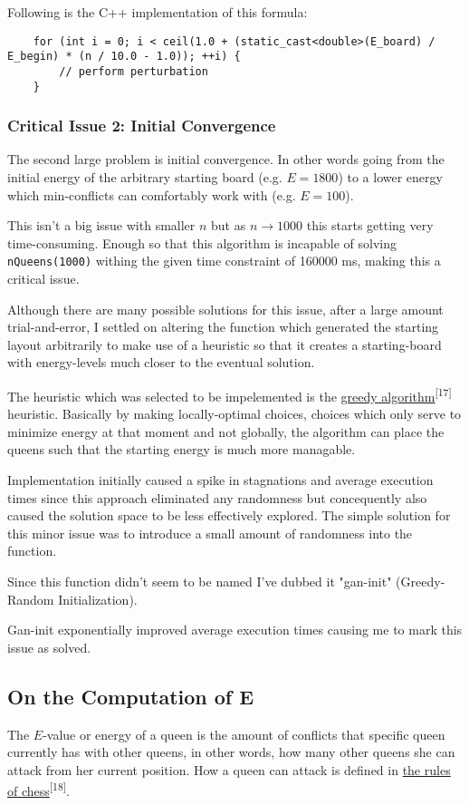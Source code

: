\documentclass{article}
\begin{document}
Following is the C++ implementation of this formula:

\begin{lstlisting}
    for (int i = 0; i < ceil(1.0 + (static_cast<double>(E_board) / E_begin) * (n / 10.0 - 1.0)); ++i) {
        // perform perturbation
    }
\end{lstlisting}

\subsubsection{Critical Issue 2: Initial Convergence}
The second large problem is initial convergence. In other words going from the initial energy of the arbitrary starting board (e.g. $E=1800$)
to a lower energy which min-conflicts can comfortably work with (e.g. $E=100$).

This isn't a big issue with smaller $n$ but as $n \to 1000$ this starts getting very time-consuming.
Enough so that this algorithm is incapable of solving \texttt{nQueens(1000)} withing the given time constraint of 160000 ms, making this a critical issue.

Although there are many possible solutions for this issue, after a large amount trial-and-error,
I settled on altering the function which generated the starting layout arbitrarily to make use of a heuristic so that it creates
a starting-board with energy-levels much closer to the eventual solution.

The heuristic which was selected to be impelemented is the \href{https://en.wikipedia.org/wiki/Greedy_algorithm}{greedy algorithm}\textsuperscript{[17]} heuristic.
Basically by making locally-optimal choices, choices which only serve to minimize energy at that moment and not globally,
the algorithm can place the queens such that the starting energy is much more managable.

Implementation initially caused a spike in stagnations and average execution times since this approach eliminated any randomness
but concequently also caused the solution space to be less effectively explored. The simple solution for this minor issue was to introduce a small amount of randomness
into the function.

Since this function didn't seem to be named I've dubbed it "gan-init" (Greedy-Random Initialization).

Gan-init exponentially improved average execution times causing me to mark this issue as solved.

\subsection{On the Computation of E}
The $E$-value or energy of a queen is the amount of conflicts that specific queen currently has with other queens, in other words,
how many other queens she can attack from her current position. How a queen can attack is defined in
\href{https://en.wikipedia.org/wiki/Queen_(chess)\#Placement\_and\_movement}{the rules of chess}\textsuperscript{[18]}.
\end{document}
